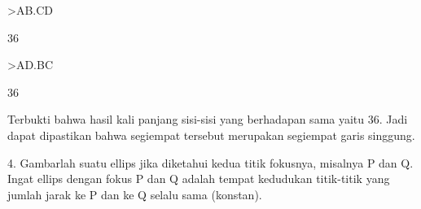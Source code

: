 \documentclass[a4paper,10pt]{article}
\begin{document}
\begin{eulernotebook}
\begin{eulercomment}
\begin{eulercomment}
\begin{eulercomment}
\begin{eulercomment}
\begin{eulercomment}
\begin{eulercomment}
\begin{eulercomment}
\begin{eulercomment}
\begin{eulercomment}
\begin{eulercomment}
\begin{eulercomment}
\begin{eulercomment}
\begin{eulercomment}
\begin{eulercomment}
\begin{eulercomment}
\begin{eulercomment}
\begin{eulercomment}
\begin{eulercomment}
\begin{eulerprompt}
>AB.CD
\end{eulerprompt}
\begin{euleroutput}
  36
\end{euleroutput}
\begin{eulerprompt}
>AD.BC
\end{eulerprompt}
\begin{euleroutput}
  36
\end{euleroutput}
\begin{eulercomment}
Terbukti bahwa hasil kali panjang sisi-sisi yang berhadapan sama yaitu
36. Jadi dapat dipastikan bahwa segiempat tersebut merupakan segiempat
garis singgung.


4. Gambarlah suatu ellips jika diketahui kedua titik fokusnya,
misalnya P dan Q. Ingat ellips dengan fokus P dan Q adalah tempat
kedudukan titik-titik yang jumlah jarak ke P dan ke Q selalu sama
(konstan).


\end{eulercomment}
\end{eulercomment}
\end{eulercomment}
\end{eulercomment}
\end{eulercomment}
\end{eulercomment}
\end{eulercomment}
\end{eulercomment}
\end{eulercomment}
\end{eulercomment}
\end{eulercomment}
\end{eulercomment}
\end{eulercomment}
\end{eulercomment}
\end{eulercomment}
\end{eulercomment}
\end{eulercomment}
\end{eulercomment}
\end{eulercomment}
\end{eulernotebook}
\end{document}
